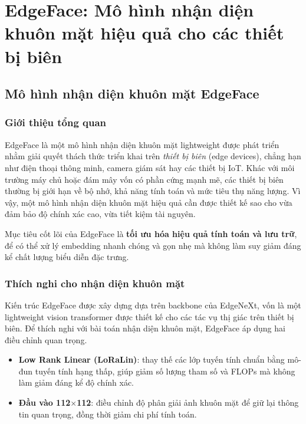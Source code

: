 \section{EdgeFace: Mô hình nhận diện khuôn mặt hiệu quả cho các thiết bị biên}
\label{sec:edgeface-lessons}


\subsection{Mô hình nhận diện khuôn mặt EdgeFace}

\subsubsection{Giới thiệu tổng quan}
EdgeFace là một mô hình nhận diện khuôn mặt lightweight được phát triển nhằm giải quyết thách thức triển khai trên \textit{thiết bị biên} (edge devices), chẳng hạn như điện thoại thông minh, camera giám sát hay các thiết bị IoT. Khác với môi trường máy chủ hoặc đám mây vốn có phần cứng mạnh mẽ, các thiết bị biên thường bị giới hạn về bộ nhớ, khả năng tính toán và mức tiêu thụ năng lượng. Vì vậy, một mô hình nhận diện khuôn mặt hiệu quả cần được thiết kế sao cho vừa đảm bảo độ chính xác cao, vừa tiết kiệm tài nguyên. 

Mục tiêu cốt lõi của EdgeFace là \textbf{tối ưu hóa hiệu quả tính toán và lưu trữ}, để có thể xử lý embedding nhanh chóng và gọn nhẹ mà không làm suy giảm đáng kể chất lượng biểu diễn đặc trưng.

\subsubsection{Thích nghi cho nhận diện khuôn mặt}
Kiến trúc EdgeFace được xây dựng dựa trên backbone của EdgeNeXt, vốn là một lightweight vision transformer được thiết kế cho các tác vụ thị giác trên thiết bị biên. Để thích nghi với bài toán nhận diện khuôn mặt, EdgeFace áp dụng hai điều chỉnh quan trọng. 

\begin{itemize}
    \item \textbf{Low Rank Linear (LoRaLin)}: thay thế các lớp tuyến tính chuẩn bằng mô-đun tuyến tính hạng thấp, giúp giảm số lượng tham số và FLOPs mà không làm giảm đáng kể độ chính xác. 
    \item \textbf{Đầu vào 112$\times$112}: điều chỉnh độ phân giải ảnh khuôn mặt để giữ lại thông tin quan trọng, đồng thời giảm chi phí tính toán.
\end{itemize}

